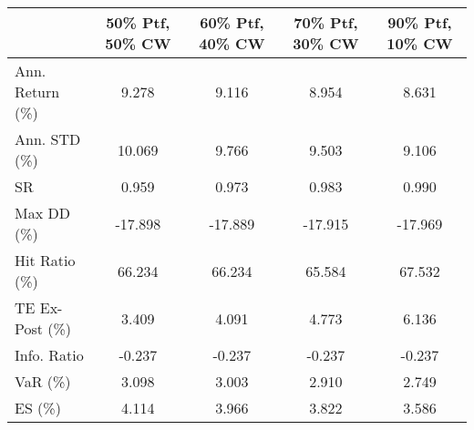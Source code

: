 \begin{tabular}{lcccc}
\toprule
{} &  50\% Ptf, 50\% CW &  60\% Ptf, 40\% CW &  70\% Ptf, 30\% CW &  90\% Ptf, 10\% CW \\
\midrule
Ann. Return (\%) &            9.278 &            9.116 &            8.954 &            8.631 \\
Ann. STD (\%)    &           10.069 &            9.766 &            9.503 &            9.106 \\
SR              &            0.959 &            0.973 &            0.983 &            0.990 \\
Max DD (\%)      &          -17.898 &          -17.889 &          -17.915 &          -17.969 \\
Hit Ratio (\%)   &           66.234 &           66.234 &           65.584 &           67.532 \\
TE Ex-Post (\%)  &            3.409 &            4.091 &            4.773 &            6.136 \\
Info. Ratio     &           -0.237 &           -0.237 &           -0.237 &           -0.237 \\
VaR (\%)         &            3.098 &            3.003 &            2.910 &            2.749 \\
ES (\%)          &            4.114 &            3.966 &            3.822 &            3.586 \\
\bottomrule
\end{tabular}
